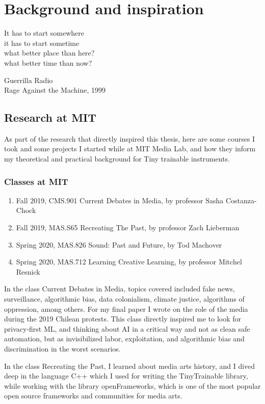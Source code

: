 \chapter{Background and inspiration}

\epigraph{It has to start somewhere \\ it has to start sometime \\ what better place than here? \\ what better time than now?}{Guerrilla Radio \\ Rage Against the Machine, 1999}

\section{Research at MIT}

As part of the research that directly inspired this thesis, here are some courses I took and some projects I started while at MIT Media Lab, and how they inform my theoretical and practical background for Tiny trainable instruments.

\subsection{Classes at MIT}

\begin{enumerate}
  \item Fall 2019, CMS.901 Current Debates in Media, by professor Sasha Costanza-Chock
  \item Fall 2019, MAS.S65 Recreating The Past, by professor Zach Lieberman
  \item Spring 2020, MAS.826 Sound: Past and Future, by Tod Machover
  \item Spring 2020, MAS.712 Learning Creative Learning, by professor Mitchel Resnick
\end{enumerate}

In the class Current Debates in Media, topics covered included fake news, surveillance, algorithmic bias, data colonialism, climate justice, algorithms of oppression, among others. For my final paper I wrote on the role of the media during the 2019 Chilean protests. This class directly inspired me to look for privacy-first \acrshort{ML}, and thinking about \acrshort{AI} in a critical way and not as clean safe automation, but as invisibilized labor, exploitation, and algorithmic bias and discrimination in the worst scenarios.

In the class Recreating the Past, I learned about media arts history, and I dived deep in the language C++ which I used for writing the TinyTrainable library, while working with the library openFrameworks, which is one of the most popular open source frameworks and communities for media arts.

